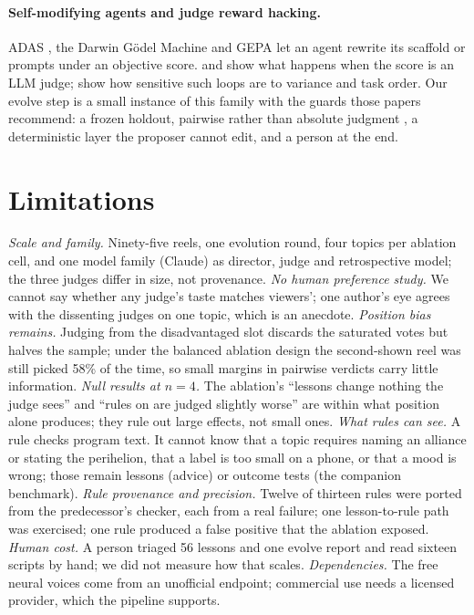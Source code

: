 \documentclass[11pt]{article}
\begin{document}
\paragraph{Self-modifying agents and judge reward hacking.} ADAS \citep{adas2024}, the Darwin G\"odel
Machine \citep{dgm2025} and GEPA \citep{gepa2025} let an agent rewrite its scaffold or prompts under
an objective score. \citet{notanoracle2026} and \citet{moreconvincing2026} show what happens when the
score is an LLM judge; \citet{fragility2026} show how sensitive such loops are to variance and task
order. Our evolve step is a small instance of this family with the guards those papers recommend: a
frozen holdout, pairwise rather than absolute judgment \citep{mtbench2023}, a deterministic layer the
proposer cannot edit, and a person at the end.

\section{Limitations}
\label{sec:limits}
\emph{Scale and family.} Ninety-five reels, one evolution round, four topics per ablation cell, and one
model family (Claude) as director, judge and retrospective model; the three judges differ in size, not
provenance. \emph{No human preference study.} We cannot say whether any judge's taste matches viewers';
one author's eye agrees with the dissenting judges on one topic, which is an anecdote. \emph{Position
bias remains.} Judging from the disadvantaged slot discards the saturated votes but halves the sample;
under the balanced ablation design the second-shown reel was still picked 58\% of the time, so small
margins in pairwise verdicts carry little information. \emph{Null results at $n=4$.} The
ablation's ``lessons change nothing the judge sees'' and ``rules on are judged slightly worse'' are
within what position alone produces; they rule out large effects, not small ones. \emph{What rules can
see.} A rule checks program text. It cannot know that a topic requires naming an alliance or stating
the perihelion, that a label is too small on a phone, or that a mood is wrong; those remain lessons
(advice) or outcome tests (the companion benchmark). \emph{Rule provenance and precision.} Twelve of
thirteen rules were ported from the predecessor's checker, each from a real failure; one
lesson-to-rule path was exercised; one rule produced a false positive that the ablation exposed.
\emph{Human cost.} A person triaged 56 lessons and one evolve report and read sixteen scripts by
hand; we did not measure how that scales. \emph{Dependencies.} The free neural voices come from an
unofficial endpoint; commercial use needs a licensed provider, which the pipeline supports.
\end{document}

